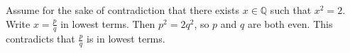 Assume for the sake of contradiction that there exists $x \in \mathbb{Q}$ such that $x^{2} = 2$.
Write $x = \frac{p}{q}$ in lowest terms.
Then $p^{2} = 2q^{2}$, so $p$ and $q$ are both even.
This contradicts that $\frac{p}{q}$ is in lowest terms.